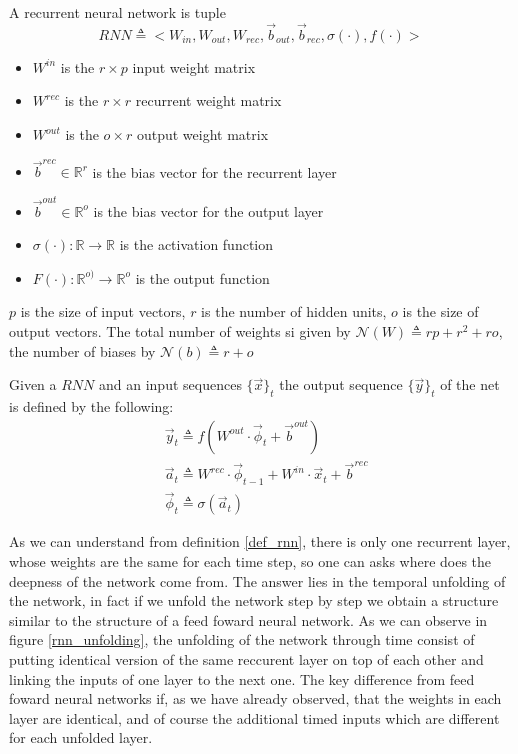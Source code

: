\begin{defn}
\label{def_rnn}
A recurrent  neural network is tuple
$$RNN\triangleq< W_{in}, W_{out}, W_{rec},\vec{b}_{out}, \vec{b}_{rec} ,\sigma(\cdot),f(\cdot)>$$
\begin{itemize}
 \item $W^{in}$ is the $r\times p$ input weight matrix
 \item $W^{rec}$ is the $r\times r$ recurrent weight matrix
 \item $W^{out}$ is the $o \times r$ output weight matrix
 \item $\vec{b}^{rec} \in \mathbb{R}^{r}$ is the bias vector for the recurrent layer
 \item $\vec{b}^{out} \in \mathbb{R}^{o}$ is the bias vector for the output layer
 \item $\sigma(\cdot): \mathbb{R}\rightarrow \mathbb{R}$ is the activation function
 \item $F(\cdot): \mathbb{R}^{o)}\rightarrow \mathbb{R}^{o}$ is the output function
\end{itemize}
$p$ is the size of input vectors, $r$ is the number of hidden units, $o$ is the size of output vectors. 
The total number of weights si given by $\mathcal{N}(W) \triangleq rp+r^2+ro$, the number of biases by $\mathcal{N}(b) \triangleq r+o $
\end{defn}

Given a $RNN$ and an input sequences $\{\vec{x}\}_t$ the output sequence $\{\vec{y}\}_t$ of the net is defined by the following:
\begin{align}
&\vec{y}_t \triangleq f(W^{out}\cdot\vec{\phi}_t + \vec{b}^{out})\\
&\vec{a}_t \triangleq W^{rec}\cdot\vec{\phi}_{t-1}+W^{in}\cdot\vec{x}_t+\vec{b}^{rec}\\
&\vec{\phi}_t \triangleq  \sigma(\vec{a}_t)
\end{align}

As we can understand from definition \ref{def_rnn}, there is only one recurrent layer, whose weights are the same for each time step, so one can asks where does the deepness of the network come from.
The answer lies in the temporal unfolding of the network, in fact if we unfold the network step by step we obtain a structure similar to the structure of a feed foward neural network. As we can observe
in figure \ref{rnn_unfolding}, the unfolding of the network through time consist of putting identical version of the same reccurent layer on top of each other and linking the inputs of one layer to the
next one. The key difference from feed foward neural networks if, as we have already observed, that the weights in each layer are identical, and of course the additional timed inputs which are different for
each unfolded layer.

